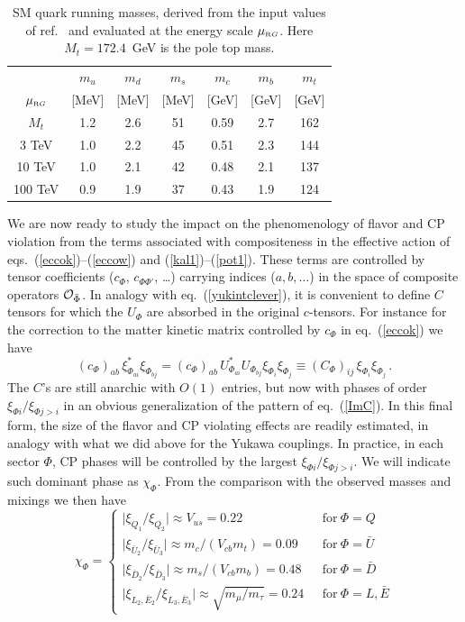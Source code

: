 \documentclass[a4paper,12pt]{article}
\newcommand{\beq}{\begin{equation}}
\newcommand{\eeq}{\end{equation}}
\def\eq#1{eq.~(\ref{#1})}
\def\eq#1{eq.~(\ref{#1})}
\def\muRG{\mu_{\scriptscriptstyle{\textrm RG}}}
\begin{document}
\renewcommand{\arraystretch}{1.2}
\begin{table}[t]
\centering
\begin{tabular}{|c|c|c|c|c|c|c|}
\hline
& $m_u$  & $m_d$  & $m_s$  & $m_c$  & $m_b$  & $m_t$  \\
$\muRG$ & [MeV] & [MeV] &  [MeV] &  [GeV] &  [GeV] &  [GeV] \\
\hline
$M_t$ & 1.2 & 2.6 & 51 & 0.59 & 2.7 & 162 \\
3 TeV & 1.0 & 2.2 & 45 & 0.51 & 2.3 & 144 \\
10 TeV & 1.0 & 2.1 & 42 & 0.48 & 2.1 &  137 \\
100 TeV & 0.9 & 1.9 & 37 & 0.43 & 1.9 & 124 \\
\hline
\end{tabular}
\renewcommand{\arraystretch}{1}
\caption{SM quark running masses, derived from the input values of ref.~\cite{Huang:2020hdv} and evaluated at the energy scale $\muRG$. Here $M_t= 172.4$~GeV is the pole top mass.}
 \label{tab:run}
 \end{table}

We are now ready to study the impact on the phenomenology of flavor and CP violation from the terms associated with compositeness in the effective action of eqs.~(\ref{eccok})--(\ref{eccow}) and
(\ref{kal1})--(\ref{pot1}). These terms are controlled by tensor coefficients ($c_\Phi$, $c_{\Phi \Phi'}$, \dots ) carrying    indices ($a,b,\dots$)  in the space of composite operators ${\cal O}_{\bar \Phi}$. In analogy with \eq{yukintclever}, it is convenient to define $C$ tensors for which  the $U_\Phi$ are absorbed in  the original  $c$-tensors. For instance for the correction to the matter kinetic matrix  controlled by $c_\Phi$ in \eq{eccok} we have
\beq
(c_\Phi)_{ab}\, \xi^*_{\Phi_{ai}}\xi_{\Phi_{bj}}=(c_\Phi)_{ab}\, U^*_{\Phi_{ai}} U_{\Phi_{bj}} \xi_{\Phi_i}\xi_{\Phi_j}
\equiv (C_\Phi)_{ij}\, \xi_{\Phi_i} \xi_{\Phi_j}\,.
\eeq
The $C$'s are still anarchic with  $O(1)$ entries, but now with phases  of order $\xi_{\Phi i}/\xi_{\Phi j>i}$ in an obvious generalization of the pattern of  \eq{ImC}.
In this final form, the size of the flavor and CP violating effects are readily estimated, in analogy with what we did above for the Yukawa couplings. In practice,  in each sector $\Phi$, CP phases will be controlled by the largest $\xi_{\Phi i}/\xi_{\Phi j>i}$. We will indicate such dominant phase as $\chi_\Phi$. From the comparison with the observed masses and  mixings we then have 
\beq
\chi_\Phi =
\left\{ \begin{array}{ll}
{|\xi_{Q_1}}/{\xi_{Q_2}}|\approx
V_{us}=0.22 & ~~~\text{for}~\Phi=Q \\
{|\xi_{\bar U_2}}/{\xi_{\bar U_3}|}\approx
m_c/(V_{cb} m_t)=0.09 & ~~~\text{for}~\Phi={\bar U} \\
{|\xi_{\bar D_2}}/{\xi_{\bar D_3}|}\approx
m_s/(V_{cb}m_b)=0.48 & ~~~\text{for}~\Phi={\bar D} \\
{|\xi_{L_2,\bar E_2}}/{\xi_{L_3,\bar E_3}|}\approx
\sqrt{m_\mu / m_\tau} =0.24 & ~~~\text{for}~\Phi=L,{\bar E} 
\end{array}
\right. 
\label{maxang}
\eeq
\end{document}
